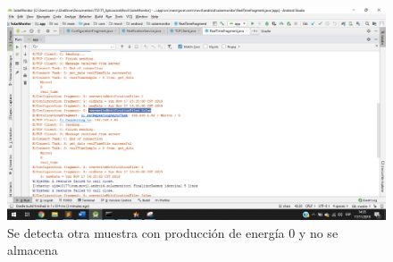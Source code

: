 \begin{figure}[H]
	\centering
	\includegraphics[scale=.4]{Capitulo4/software/submodulos/images/muestra01.jpg}
	\caption{Se detecta otra muestra con producción de energía 0 y no se almacena}	
	\label{fig:muestra 12}
\end{figure} 

